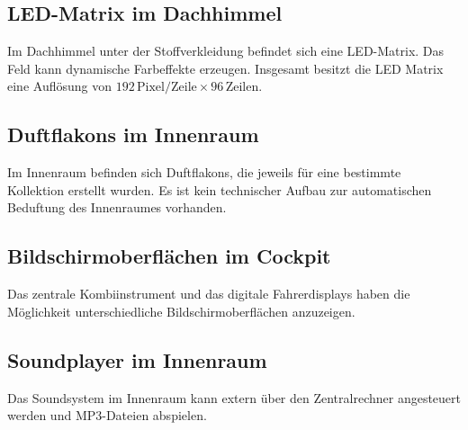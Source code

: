 \subsection{LED-Matrix im Dachhimmel}
Im Dachhimmel unter der Stoffverkleidung befindet sich eine LED-Matrix. Das Feld kann dynamische Farbeffekte erzeugen.
Insgesamt besitzt die LED Matrix eine Auflösung von $ 192 \,\mathrm{Pixel}/\mathrm{Zeile} \times 96 \,\mathrm{Zeilen} $.
\subsection{Duftflakons im Innenraum}
Im Innenraum befinden sich Duftflakons, die jeweils für eine bestimmte Kollektion erstellt wurden. Es ist kein technischer Aufbau zur automatischen Beduftung des Innenraumes vorhanden.
\subsection{Bildschirmoberflächen im Cockpit}
Das zentrale Kombiinstrument und das digitale Fahrerdisplays haben die Möglichkeit unterschiedliche Bildschirmoberflächen anzuzeigen.
\subsection{Soundplayer im Innenraum}
Das Soundsystem im Innenraum kann extern über den Zentralrechner angesteuert werden und MP3-Dateien abspielen.
